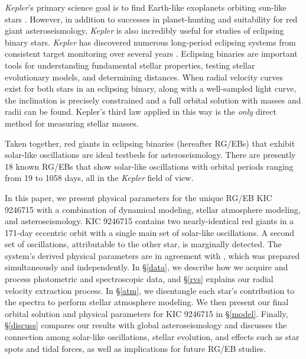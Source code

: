 \emph{Kepler}'s primary science goal is to find Earth-like exoplanets orbiting sun-like stars \citep{bor10}. However, in addition to successes in planet-hunting and suitability for red giant asteroseismology, \emph{Kepler} is also incredibly useful for studies of eclipsing binary stars. \emph{Kepler} has discovered numerous long-period eclipsing systems from consistent target monitoring over several years \citep{prs11,sla11}. Eclipsing binaries are important tools for understanding fundamental stellar properties, testing stellar evolutionary models, and determining distances. When radial velocity curves exist for both stars in an eclipsing binary, along with a well-sampled light curve, the inclination is precisely constrained and a full orbital solution with masses and radii can be found. Kepler's third law applied in this way is the \emph{only} direct method for measuring stellar masses.

Taken together, red giants in eclipsing binaries (hereafter RG/EBs) that exhibit solar-like oscillations are ideal testbeds for asteroseismology. There are presently 18 known RG/EBs that show solar-like oscillations \citep{hek10,gau13,gau14,bec14,bec15} with orbital periods ranging from 19 to 1058 days, all in the \emph{Kepler} field of view.

In this paper, we present physical parameters for the unique RG/EB KIC 9246715 with a combination of dynamical modeling, stellar atmosphere modeling, and asteroseismology. KIC 9246715 contains two nearly-identical red giants in a 171-day eccentric orbit with a single main set of solar-like oscillations. A second set of oscillations,  attributable to the other star, is marginally detected. The system's derived physical parameters are in agreement with \citet{hel15}, which was prepared simultaneously and independently. In \S \ref{data}, we describe how we acquire and process photometric and spectroscopic data, and \S \ref{rvs} explains our radial velocity extraction process. In \S \ref{atm}, we disentangle each star's contribution to the spectra to perform stellar atmosphere modeling. We then present our final orbital solution and physical parameters for KIC 9246715 in \S \ref{model}. Finally, \S \ref{discuss} compares our results with global asteroseismology and discusses the connection among solar-like oscillations, stellar evolution, and effects such as star spots and tidal forces, as well as implications for future RG/EB studies.

  
  
  
